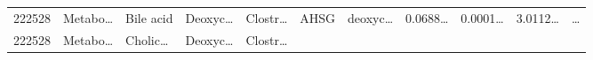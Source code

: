 \documentclass[
]{article}
\begin{document}
\begin{longtable}[]{@{}lllllllllll@{}}
\begin{minipage}[t]{0.05\columnwidth}
222528\strut
\end{minipage} & \begin{minipage}[t]{0.07\columnwidth}\raggedright
Metabo\ldots{}\strut
\end{minipage} & \begin{minipage}[t]{0.07\columnwidth}\raggedright
Bile acid\strut
\end{minipage} & \begin{minipage}[t]{0.09\columnwidth}\raggedright
Deoxyc\ldots{}\strut
\end{minipage} & \begin{minipage}[t]{0.07\columnwidth}\raggedright
Clostr\ldots{}\strut
\end{minipage} & \begin{minipage}[t]{0.07\columnwidth}\raggedright
AHSG\strut
\end{minipage} & \begin{minipage}[t]{0.09\columnwidth}\raggedright
deoxyc\ldots{}\strut
\end{minipage} & \begin{minipage}[t]{0.07\columnwidth}\raggedright
0.0688\ldots{}\strut
\end{minipage} & \begin{minipage}[t]{0.07\columnwidth}\raggedright
0.0001\ldots{}\strut
\end{minipage} & \begin{minipage}[t]{0.07\columnwidth}\raggedright
3.0112\ldots{}\strut
\end{minipage} & \begin{minipage}[t]{0.03\columnwidth}\raggedright
\ldots{}\strut
\end{minipage}\tabularnewline
\begin{minipage}[t]{0.05\columnwidth}\raggedright
222528\strut
\end{minipage} & \begin{minipage}[t]{0.07\columnwidth}\raggedright
Metabo\ldots{}\strut
\end{minipage} & \begin{minipage}[t]{0.07\columnwidth}\raggedright
Cholic\ldots{}\strut
\end{minipage} & \begin{minipage}[t]{0.09\columnwidth}\raggedright
Deoxyc\ldots{}\strut
\end{minipage} & \begin{minipage}[t]{0.07\columnwidth}\raggedright
Clostr\ldots{}\strut
\end{minipage} & \begin{minipage}[t]{0.07\columnwidth}\raggedright

\end{minipage}
\end{longtable}
\end{document}
